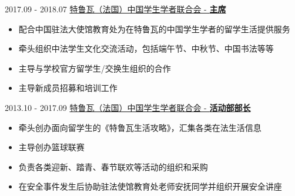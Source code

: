 \documentclass[letterpaper]{twentysecondcv} %
\begin{document}
\begin{twentyfluid}

    \twentyitemfluid
        {2017.09 - 2018.07}
        {}
        {\href{}{特鲁瓦（法国）中国学生学者联合会 - \textbf{主席}}}
        {}
        {
        {
        \vspace{-0.3cm}
        \begin{itemize}
            \item 配合中国驻法大使馆教育处为在特鲁瓦的中国学生学者的留学生活提供服务
            \item 牵头组织中法学生文化交流活动，包括端午节、中秋节、中国书法等等
            \item 主导与学校官方留学生/交换生组织的合作
            \item 主导新成员招募和培训工作
        \end{itemize}}
        }

    \twentyitemfluid
        {2013.10 - 2017.09}
        {}
        {\href{}{特鲁瓦（法国）中国学生学者联合会 - \textbf{活动部部长}}}
        {}
        {
        {
        \vspace{-0.3cm}
        \begin{itemize}
            \item 牵头创办面向留学生的《特鲁瓦生活攻略》，汇集各类在法生活信息
            \item 主导创办篮球联赛
            \item 负责各类迎新、踏青、春节联欢等活动的组织和采购
            \item 在安全事件发生后协助驻法使馆教育处老师安抚同学并组织开展安全讲座
        \end{itemize}}
        }

\end{twentyfluid}
\end{document}

